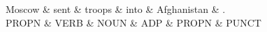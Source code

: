 \begin{parts}
    \begin{center}
    {
        \begin{dependency}
            \begin{deptext}
                Moscow  \& sent \& troops \& into  \& Afghanistan \& .     \\
                PROPN \& VERB  \& NOUN  \& ADP \& PROPN \& PUNCT \\
            \end{deptext}
        \end{dependency}
    }
    \end{center}


\end{parts}
